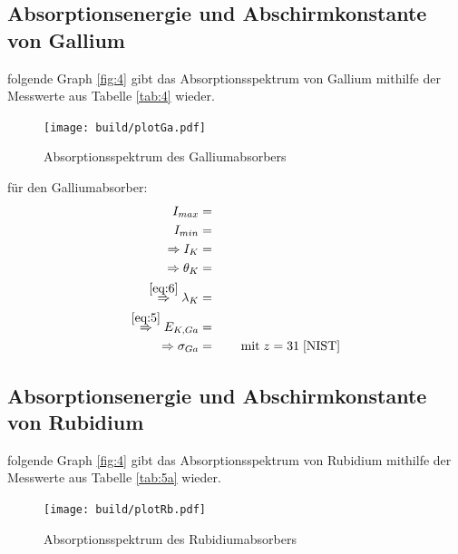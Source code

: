 \subsection{Absorptionsenergie und Abschirmkonstante von Gallium}

    \justifying folgende Graph \ref{fig:4} gibt das Absorptionsspektrum von Gallium mithilfe der Messwerte aus Tabelle \ref{tab:4} 
    wieder.

    \begin{figure}[H]
        \centering
        \texttt{[image: build/plotGa.pdf]}
        \caption{Absorptionsspektrum des Galliumabsorbers}
        \label{fig:5}
    \end{figure}

    \justifying für den Galliumabsorber:
    \begin{subequations}\label{eq:22}
    \begin{align}
        I_{max} &= \text{} \label{eq:22a}\\
        I_{min} &= \text{} \label{eq:22b}\\
        \Rightarrow I_K &= \text{} \label{eq:22c}\\
        \Rightarrow \theta_K &= \text{} \label{eq:22d}\\
        \stackrel{\eqref{eq:6}}{\Rightarrow} \lambda_K &= \text{} \label{eq:22e}\\
        \stackrel{\eqref{eq:5}}{\Rightarrow} E_{K,Ga} &= \text{} \label{eq:22f}\\
        \Rightarrow \sigma_{Ga} &= \text{} \qquad \text{mit}\; z=31\; \text{\cite{NIST}} \label{eq:22g}
    \end{align}
    \end{subequations}

\subsection{Absorptionsenergie und Abschirmkonstante von Rubidium}

    \justifying folgende Graph \ref{fig:4} gibt das Absorptionsspektrum von Rubidium mithilfe der Messwerte aus Tabelle \ref{tab:5a} 
    wieder.

    \begin{figure}[H]
        \centering
        \texttt{[image: build/plotRb.pdf]}
        \caption{Absorptionsspektrum des Rubidiumabsorbers}
        \label{fig:6}
    \end{figure}


